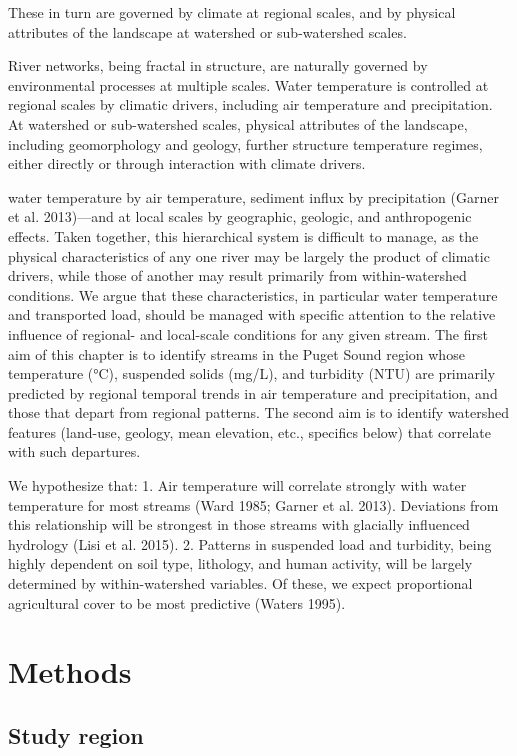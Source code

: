 \documentclass{article}
\begin{document}
These in turn are governed by climate at regional scales, and by physical attributes of the landscape at watershed or sub-watershed scales.


River networks, being fractal in structure, are naturally governed by environmental processes at multiple scales.  Water temperature is controlled at regional scales by climatic drivers, including air temperature and precipitation. At watershed or sub-watershed scales, physical attributes of the landscape, including geomorphology and geology, further structure temperature regimes, either directly or through interaction with climate drivers.

water temperature by air temperature, sediment influx by precipitation (Garner et al. 2013)—and at local scales by geographic, geologic, and anthropogenic effects.  Taken together, this hierarchical system is difficult to manage, as the physical characteristics of any one river may be largely the product of climatic drivers, while those of another may result primarily from within-watershed conditions. We argue that these characteristics, in particular water temperature and transported load, should be managed with specific attention to the relative influence of regional- and local-scale conditions for any given stream. The first aim of this chapter is to identify streams in the Puget Sound region whose temperature (°C), suspended solids (mg/L), and turbidity (NTU) are primarily predicted by regional temporal trends in air temperature and precipitation, and those that depart from regional patterns.  The second aim is to identify watershed features (land-use, geology, mean elevation, etc., specifics below) that correlate with such departures.


We hypothesize that:
1.  Air temperature will correlate strongly with water temperature for most streams (Ward 1985; Garner et al. 2013).  Deviations from this relationship will be strongest in those streams with glacially influenced hydrology (Lisi et al. 2015).
2.  Patterns in suspended load and turbidity, being highly dependent on soil type, lithology, and human activity, will be largely determined by within-watershed variables. Of these, we expect proportional agricultural cover to be most predictive (Waters 1995).

\section*{Methods}

\subsection*{Study region}
\end{document}

